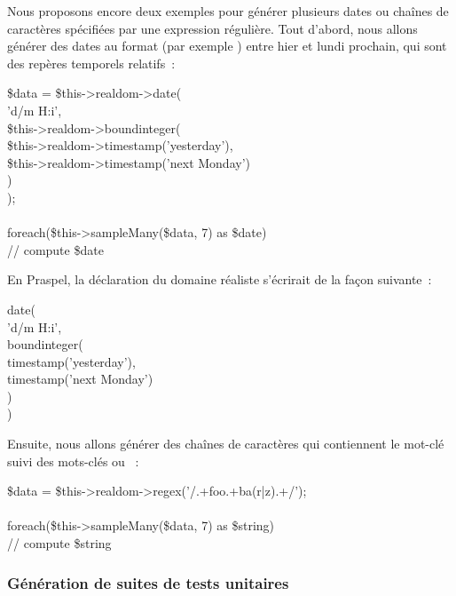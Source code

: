 \begin{example}

Nous proposons encore deux exemples pour générer plusieurs dates ou chaînes de
caractères spécifiées par une expression régulière. Tout d'abord, nous allons
générer des dates au format  (par exemple )
entre hier et lundi prochain, qui sont des repères temporels relatifs~:

%
\begin{pre}
\$data = \$this->realdom->date( \\
    'd/m H:i', \\
    \$this->realdom->boundinteger( \\
        \$this->realdom->timestamp('yesterday'), \\
        \$this->realdom->timestamp('next Monday') \\
    ) \\
); \\
 \\
foreach(\$this->sampleMany(\$data, 7) as \$date) \\
    // compute \$date
\end{pre}
%
En Praspel, la déclaration du domaine réaliste s'écrirait de la façon suivante~:
%
\begin{pre}
date( \\
    'd/m H:i', \\
    boundinteger( \\
        timestamp('yesterday'), \\
        timestamp('next Monday') \\
    ) \\
)
\end{pre}
%
Ensuite, nous allons générer des chaînes de caractères qui contiennent
le mot-clé  suivi des mots-clés  ou ~:
%
\begin{pre}
\$data = \$this->realdom->regex('/.+foo.+ba(r|z).+/'); \\
 \\
foreach(\$this->sampleMany(\$data, 7) as \$string) \\
    // compute \$string
\end{pre}

\end{example}

\subsubsection{Génération de suites de tests unitaires}

